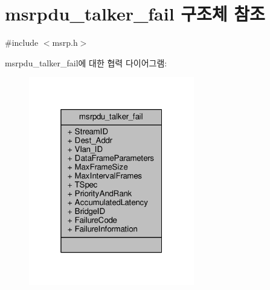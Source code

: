 \hypertarget{structmsrpdu__talker__fail}{}\section{msrpdu\+\_\+talker\+\_\+fail 구조체 참조}
\label{structmsrpdu__talker__fail}


{\ttfamily \#include $<$msrp.\+h$>$}



msrpdu\+\_\+talker\+\_\+fail에 대한 협력 다이어그램\+:
\nopagebreak
\begin{figure}[H]
\begin{center}
\leavevmode
\includegraphics[width=205pt]{structmsrpdu__talker__fail__coll__graph}
\end{center}
\end{figure}
